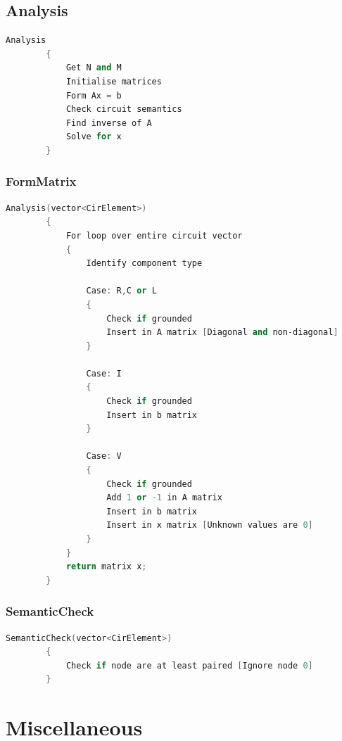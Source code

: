 \documentclass[a4paper, titlepage]{article}
\begin{document}
    \subsection{Analysis}
    \begin{lstlisting}[language=C++]
        Analysis
        {
            Get N and M
            Initialise matrices
            Form Ax = b
            Check circuit semantics
            Find inverse of A
            Solve for x
        }
    \end{lstlisting}

    \subsubsection{FormMatrix}
    \begin{lstlisting}[language=C++]
        Analysis(vector<CirElement>)
        {
            For loop over entire circuit vector
            {
                Identify component type

                Case: R,C or L
                {
                    Check if grounded
                    Insert in A matrix [Diagonal and non-diagonal]
                }
                
                Case: I
                {
                    Check if grounded
                    Insert in b matrix
                }

                Case: V
                {
                    Check if grounded
                    Add 1 or -1 in A matrix             
                    Insert in b matrix
                    Insert in x matrix [Unknown values are 0]            
                }
            }
            return matrix x;
        }
    \end{lstlisting}
    \subsubsection{SemanticCheck}
    \begin{lstlisting}[language=C++]
        SemanticCheck(vector<CirElement>)
        {
            Check if node are at least paired [Ignore node 0]
        }
    \end{lstlisting}
    
    \pagebreak
    \section{Miscellaneous}



    \pagebreak
    \printbibliography[title={References}]
\end{document}
